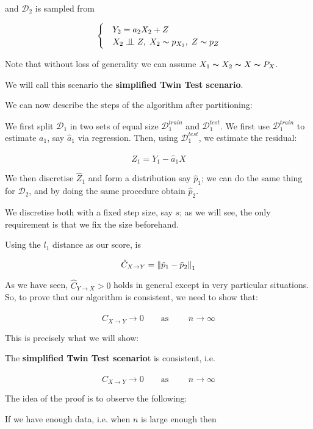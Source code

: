 and $\mathcal{D}_2$ is sampled from 

\[ \begin{cases} 
    & Y_2 = a_2 X_2 + Z  \\
    & X_2 \bigCI Z,\; X_2 \thicksim p_{X_2},\; Z \thicksim p_{Z}  
 \end{cases}
\]

Note that without loss of generality we can assume $X_1 \thicksim X_2 \thicksim X \thicksim P_X$.

We will call this scenario the \textbf{simplified Twin Test scenario}. 

We can now describe the steps of the algorithm after partitioning:

We first split $\mathcal{D}_1$ in two sets of equal size $\mathcal{D}_{1}^{train}$ and 
$\mathcal{D}_{1}^{test}$. We first use $\mathcal{D}_{1}^{train}$ to estimate $a_1$, say $\hat{a}_1$ via 
regression. Then, using $\mathcal{D}_{1}^{test}$, we estimate the residual:

$$
    \hat{Z}_1 = Y_1 - \hat{a}_1 X
$$

We then discretise $\hat{Z}_1$ and form a distribution say $\hat{p}_1$; we can do the same thing for 
$\mathcal{D}_2$, and by doing the same procedure obtain $\hat{p}_2$.

We discretise both with a fixed step size, say $s$; as we will see, the only requirement is that we fix 
the size beforehand.

Using the $l_1$ distance as our score, is 

$$
    \hat{C}_{X \rightarrow Y} = \left\lVert\hat{p}_1 - \hat{p}_2\right\rVert_1
$$

As we have seen, $\hat{C}_{Y \rightarrow X} > 0$ holds in general except in very particular situations. So, 
to prove that our algorithm is consistent, we need to show that:

$$
    \hat{C}_{X \rightarrow Y} \rightarrow 0 \qquad \text{as }  \qquad n \rightarrow \infty
$$

This is precisely what we will show:

\begin{theorem}
    The \textbf{simplified Twin Test scenario}t is consistent, i.e. 

$$
    \hat{C}_{X \rightarrow Y} \rightarrow 0 \qquad \text{as }  \qquad n \rightarrow \infty
$$
\end{theorem}

The idea of the proof is to observe the following:

If we have enough data, i.e. when $n$ is large enough then 

